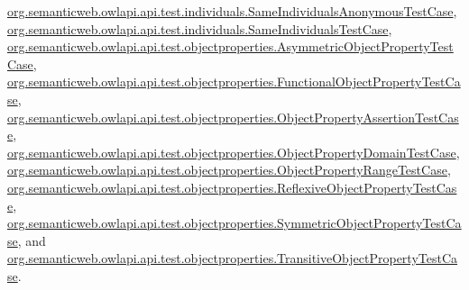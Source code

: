 \hyperlink{classorg_1_1semanticweb_1_1owlapi_1_1api_1_1test_1_1individuals_1_1_same_individuals_anonymous_test_case_ae289fc762267ac73714b4d5a0e6aabdb}{org.\-semanticweb.\-owlapi.\-api.\-test.\-individuals.\-Same\-Individuals\-Anonymous\-Test\-Case}, \hyperlink{classorg_1_1semanticweb_1_1owlapi_1_1api_1_1test_1_1individuals_1_1_same_individuals_test_case_aa042386a08321465610183fafaffd2d0}{org.\-semanticweb.\-owlapi.\-api.\-test.\-individuals.\-Same\-Individuals\-Test\-Case}, \hyperlink{classorg_1_1semanticweb_1_1owlapi_1_1api_1_1test_1_1objectproperties_1_1_asymmetric_object_property_test_case_aac42a98271bbdbc4999512ad2171e744}{org.\-semanticweb.\-owlapi.\-api.\-test.\-objectproperties.\-Asymmetric\-Object\-Property\-Test\-Case}, \hyperlink{classorg_1_1semanticweb_1_1owlapi_1_1api_1_1test_1_1objectproperties_1_1_functional_object_property_test_case_ac40dbfa54d84503011b230fa346ee41d}{org.\-semanticweb.\-owlapi.\-api.\-test.\-objectproperties.\-Functional\-Object\-Property\-Test\-Case}, \hyperlink{classorg_1_1semanticweb_1_1owlapi_1_1api_1_1test_1_1objectproperties_1_1_object_property_assertion_test_case_af3061f21e20089901a40e6e73656a12f}{org.\-semanticweb.\-owlapi.\-api.\-test.\-objectproperties.\-Object\-Property\-Assertion\-Test\-Case}, \hyperlink{classorg_1_1semanticweb_1_1owlapi_1_1api_1_1test_1_1objectproperties_1_1_object_property_domain_test_case_af09be466c7672cbfb9ea2bc1a9958fc6}{org.\-semanticweb.\-owlapi.\-api.\-test.\-objectproperties.\-Object\-Property\-Domain\-Test\-Case}, \hyperlink{classorg_1_1semanticweb_1_1owlapi_1_1api_1_1test_1_1objectproperties_1_1_object_property_range_test_case_a3db103f2e9fa7c53427da1f8102036dd}{org.\-semanticweb.\-owlapi.\-api.\-test.\-objectproperties.\-Object\-Property\-Range\-Test\-Case}, \hyperlink{classorg_1_1semanticweb_1_1owlapi_1_1api_1_1test_1_1objectproperties_1_1_reflexive_object_property_test_case_a75bb0fae9062c1e9c04bb6ce24f107c8}{org.\-semanticweb.\-owlapi.\-api.\-test.\-objectproperties.\-Reflexive\-Object\-Property\-Test\-Case}, \hyperlink{classorg_1_1semanticweb_1_1owlapi_1_1api_1_1test_1_1objectproperties_1_1_symmetric_object_property_test_case_ac27dd082529b23040840a679015cd0ea}{org.\-semanticweb.\-owlapi.\-api.\-test.\-objectproperties.\-Symmetric\-Object\-Property\-Test\-Case}, and \hyperlink{classorg_1_1semanticweb_1_1owlapi_1_1api_1_1test_1_1objectproperties_1_1_transitive_object_property_test_case_a7555f9e2c1f7ac2f3738b31c7806b383}{org.\-semanticweb.\-owlapi.\-api.\-test.\-objectproperties.\-Transitive\-Object\-Property\-Test\-Case}.

